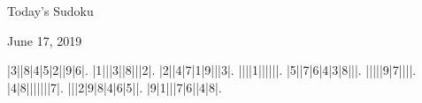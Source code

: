 \documentclass{article}
\begin{document}
\begin{center}
\Huge{Today's Sudoku}
\end{center}
\begin{center}
\Large{June 17, 2019}
\end{center}
\begin{sudoku}
|3||8|4|5|2||9|6|.
|1|||3||8|||2|.
|2||4|7|1|9|||3|.
||||1||||||.
|5||7|6|4|3|8|||.
|||||9|7||||.
|4|8|||||||7|.
|||2|9|8|4|6|5||.
|9|1|||7|6||4|8|.
\end{sudoku}
\end{document}
